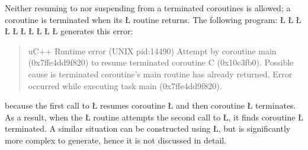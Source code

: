 \documentclass[openright,twoside]{report}
\begin{document}
Neither resuming to nor suspending from a terminated coroutines is allowed;
a coroutine is terminated when its \LGinlinetrue\LGbegin\lgrinde\L{}\endlgrinde\LGend{} routine returns.
The following program:
\LGinlinefalse\LGbegin\lgrinde
\L{}
\L{\LB{}}
\L{}
\L{\LB{}}
\L{\LB{\};}}
\L{}
\L{\LB{}}
\L{\LB{}}
\CE{}\L{\LB{}}
\CE{}\L{\LB{\}}}
\endlgrinde\LGend
generates this error:
\begin{quote}
\BGfont
uC++ Runtime error (UNIX pid:14490) Attempt by coroutine main (0x7ffe4dd9f820) to resume terminated coroutine C (0x10c3fb0).
Possible cause is terminated coroutine's main routine has already returned.
Error occurred while executing task main (0x7ffe4dd9f820).
\end{quote}
because the first call to \LGinlinetrue\LGbegin\lgrinde\L{}\endlgrinde\LGend{} resumes coroutine \LGinlinetrue\LGbegin\lgrinde\L{}\endlgrinde\LGend{} and then coroutine \LGinlinetrue\LGbegin\lgrinde\L{}\endlgrinde\LGend{} terminates.
As a result, when the \LGinlinetrue\LGbegin\lgrinde\L{}\endlgrinde\LGend{} routine attempts the second call to \LGinlinetrue\LGbegin\lgrinde\L{}\endlgrinde\LGend{}, it finds coroutine \LGinlinetrue\LGbegin\lgrinde\L{}\endlgrinde\LGend{} terminated.
A similar situation can be constructed using \LGinlinetrue\LGbegin\lgrinde\L{}\endlgrinde\LGend{}, but is significantly more complex to generate, hence it is not discussed in detail.
\end{document}

